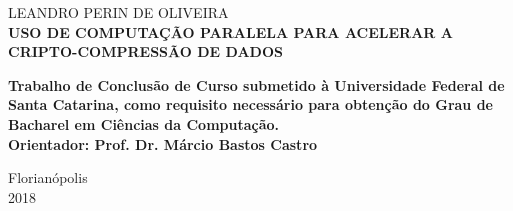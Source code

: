 
\begin{center}

    {\large LEANDRO PERIN DE OLIVEIRA\\}
    \vspace{8cm}
    {\Large \textsc\textbf{{USO DE COMPUTAÇÃO PARALELA PARA ACELERAR A CRIPTO-COMPRESSÃO DE DADOS} }\\}
    \vspace{1cm}
    \hspace{.45\linewidth}
    \begin{minipage}{.50\linewidth}

            \textbf{Trabalho de Conclusão de Curso submetido à Universidade Federal de Santa Catarina,  como requisito 
            necessário para obtenção do Grau de Bacharel em Ciências da Computação. \\
            Orientador: Prof. Dr. Márcio Bastos Castro}

           
    
    \end{minipage}

    \vspace{2cm}
    \vfill
    {\large Florianópolis \\ 2018}
\end{center}

